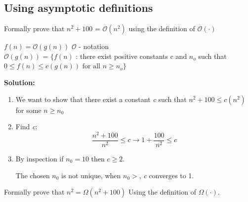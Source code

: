 \documentclass[11pt,fleqn]{book}
\begin{document}
\subsection{Using asymptotic definitions}
\begin{example}
Formally prove that $n^2+ 100 \text{ = }\mathcal{O}(n^2)$ using the definition of $\mathcal{O}(\cdot)$
\end{example}
\begin{definition} \textbf{$f(n) = \mathcal{O}(g(n))$} $\mathcal{O}$ - notation\\
     $\mathcal{O}(g(n))$ = $\{f(n)$ : there exist positive constants c and  $n_o$ such that\\ $
    0 \leq f(n) \leq c(g(n)) \text{ for all } n \geq n_o\}$
    \end{definition}
\textbf{Solution:}
\begin{enumerate}
    \item We want to show that  there exist a constant \textit{c} such that $n^2 + 100 \leq c(n^2)$ for some $n \geq n_0$
    \item Find \textit{c}:  $$
    \frac{n^2 + 100}{n^2} \leq c \rightarrow
    1 + \frac{100}{n^2} \leq c$$
    \item By inspection if $n_0 = 10$ then $c \geq 2$. 
    \begin{remark}
    The chosen $n_0$ is not unique, when $n_0 >$, \textit{c} converges to 1. 
    \end{remark}
\end{enumerate}
\begin{example}
Formally prove that $n^2= \Omega(n^2+ 100)$ Using the definition of $\Omega(\cdot)$.
\end{example}
\end{document}

